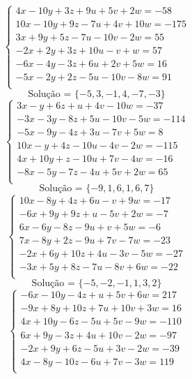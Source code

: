 \documentclass[12pt,oneside,a4paper]{article}
\begin{document}
\vspace{\baselineskip}
\begin{equation*}
\begin{cases}
4x-10y+3z+9u+5v+2w=-58 \\
10x-10y+9z-7u+4v+10w=-175 \\
3x+9y+5z-7u-10v-2w=55 \\
-2x+2y+3z+10u-v+w=57 \\
-6x-4y-3z+6u+2v+5w=16 \\
-5x-2y+2z-5u-10v-8w=91 \\
\end{cases}
\end{equation*}
\begin{equation*}
\text{Solução = }\{-5,3,-1,4,-7,-3\}
\end{equation*}
\vspace{\baselineskip}
\begin{equation*}
\begin{cases}
3x-y+6z+u+4v-10w=-37 \\
-3x-3y-8z+5u-10v-5w=-114 \\
-5x-9y-4z+3u-7v+5w=8 \\
10x-y+4z-10u-4v-2w=-115 \\
4x+10y+z-10u+7v-4w=-16 \\
-8x-5y-7z-4u+5v+2w=65 \\
\end{cases}
\end{equation*}
\begin{equation*}
\text{Solução = }\{-9,1,6,1,6,7\}
\end{equation*}
\vspace{\baselineskip}
\begin{equation*}
\begin{cases}
10x-8y+4z+6u-v+9w=-17 \\
-6x+9y+9z+u-5v+2w=-7 \\
6x-6y-8z-9u+v+5w=-6 \\
7x-8y+2z-9u+7v-7w=-23 \\
-2x+6y+10z+4u-3v-5w=-27 \\
-3x+5y+8z-7u-8v+6w=-22 \\
\end{cases}
\end{equation*}
\begin{equation*}
\text{Solução = }\{-5,-2,-1,1,3,2\}
\end{equation*}
\vspace{\baselineskip}
\begin{equation*}
\begin{cases}
-6x-10y-4z+u+5v+6w=217 \\
-9x+8y+10z+7u+10v+3w=16 \\
4x+10y-6z-5u+5v-9w=-110 \\
6x+9y-3z+4u+10v-2w=-97 \\
-2x+9y+6z-5u+3v-2w=-39 \\
4x-8y-10z-6u+7v-3w=119 \\
\end{cases}
\end{equation*}
\end{document}
